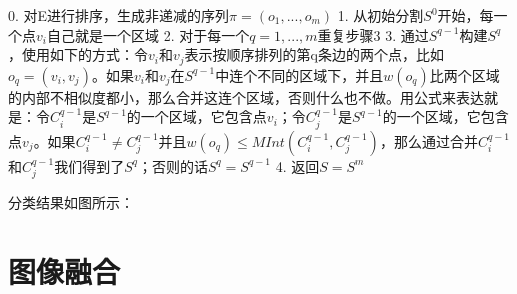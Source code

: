 0. 对E进行排序，生成非递减的序列\(\pi = (o_1,...,o_m)\)
1. 从初始分割\(S^0\)开始，每一个点\(v_i\)自己就是一个区域
2. 对于每一个\(q = 1,...,m\)重复步骤3
3. 通过\(S^{q-1}\)构建\(S^q\)，使用如下的方式：令\(v_i\)和\(v_j\)表示按顺序排列的第q条边的两个点，比如\(o_q = (v_i,v_j)\)。如果\(v_i\)和\(v_j\)在\(S^{q-1}\)中连个不同的区域下，并且\(w(o_q)\)比两个区域的内部不相似度都小，那么合并这连个区域，否则什么也不做。用公式来表达就是：令\(C_{i}^{q-1}\)是\(S^{q-1}\)的一个区域，它包含点\(v_i\)；令\(C_{j}^{q-1}\)是\(S^{q-1}\)的一个区域，它包含点\(v_j\)。如果\(C_{i}^{q-1} \neq C_{j}^{q-1}\)并且\(w(o_q) \leq MInt(C_i^{q-1},C_j^{q-1})\)，那么通过合并\(C_{i}^{q-1}\)和\(C_{j}^{q-1}\)我们得到了\(S^q\)；否则的话\(S^q = S^{q-1}\)
4. 返回\(S = S^m\)

分类结果如图所示：


\section{图像融合}

\ifx\usechapbib\empty
\nocite{BSTcontrol}


\fi